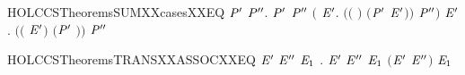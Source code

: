 \begin{SaveVerbatim}{HOLCCSTheoremsSUMXXcasesXXEQ}
\HOLTokenTurnstile{} \HOLSymConst{\HOLTokenForall{}} \ensuremath{\HOLBoundVar{P}\sp{\prime{}}}  \ensuremath{\HOLBoundVar{P}\sp{\prime{}\prime{}}}.
      \HOLSymConst{\ensuremath{+}} \ensuremath{\HOLBoundVar{P}\sp{\prime{}}} \HOLTokenTransBegin{}\HOLTokenTransEnd \ensuremath{\HOLBoundVar{P}\sp{\prime{}\prime{}}} \HOLSymConst{\HOLTokenEquiv{}}
     \ensuremath{(}\HOLSymConst{\HOLTokenExists{}} \ensuremath{\HOLBoundVar{E}\sp{\prime{}}}. \ensuremath{(}\ensuremath{(} \HOLSymConst{\ensuremath{=}} \ensuremath{)} \HOLSymConst{\HOLTokenConj{}} \ensuremath{(}\ensuremath{\HOLBoundVar{P}\sp{\prime{}}} \HOLSymConst{\ensuremath{=}} \ensuremath{\HOLBoundVar{E}\sp{\prime{}}}\ensuremath{)}\ensuremath{)} \HOLSymConst{\HOLTokenConj{}}  \HOLTokenTransBegin{}\HOLTokenTransEnd \ensuremath{\HOLBoundVar{P}\sp{\prime{}\prime{}}}\ensuremath{)} \HOLSymConst{\HOLTokenDisj{}}
     \HOLSymConst{\HOLTokenExists{}} \ensuremath{\HOLBoundVar{E}\sp{\prime{}}}. \ensuremath{(}\ensuremath{(} \HOLSymConst{\ensuremath{=}} \ensuremath{\HOLBoundVar{E}\sp{\prime{}}}\ensuremath{)} \HOLSymConst{\HOLTokenConj{}} \ensuremath{(}\ensuremath{\HOLBoundVar{P}\sp{\prime{}}} \HOLSymConst{\ensuremath{=}} \ensuremath{)}\ensuremath{)} \HOLSymConst{\HOLTokenConj{}}  \HOLTokenTransBegin{}\HOLTokenTransEnd \ensuremath{\HOLBoundVar{P}\sp{\prime{}\prime{}}}
\end{SaveVerbatim}
\newcommand{\HOLCCSTheoremsSUMXXcasesXXEQ}{\UseVerbatim{HOLCCSTheoremsSUMXXcasesXXEQ}}
\begin{SaveVerbatim}{HOLCCSTheoremsTRANSXXASSOCXXEQ}
\HOLTokenTurnstile{} \HOLSymConst{\HOLTokenForall{}} \ensuremath{\HOLBoundVar{E}\sp{\prime{}}} \ensuremath{\HOLBoundVar{E}\sp{\prime{}\prime{}}} \ensuremath{\HOLBoundVar{E}\sb{\mathrm{1}}} .  \HOLSymConst{\ensuremath{+}} \ensuremath{\HOLBoundVar{E}\sp{\prime{}}} \HOLSymConst{\ensuremath{+}} \ensuremath{\HOLBoundVar{E}\sp{\prime{}\prime{}}} \HOLTokenTransBegin{}\HOLTokenTransEnd \ensuremath{\HOLBoundVar{E}\sb{\mathrm{1}}} \HOLSymConst{\HOLTokenEquiv{}}  \HOLSymConst{\ensuremath{+}} \ensuremath{(}\ensuremath{\HOLBoundVar{E}\sp{\prime{}}} \HOLSymConst{\ensuremath{+}} \ensuremath{\HOLBoundVar{E}\sp{\prime{}\prime{}}}\ensuremath{)} \HOLTokenTransBegin{}\HOLTokenTransEnd \ensuremath{\HOLBoundVar{E}\sb{\mathrm{1}}}
\end{SaveVerbatim}
